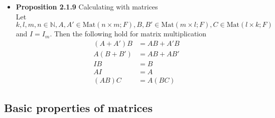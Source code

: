 \documentclass[11pt,a4paper]{article}
\begin{document}
\begin{itemize}
    \item \textbf{Proposition 2.1.9} Calculating with matrices \\
        Let $k, l, m, n \in \mathbb{N}, A, A' \in \mathrm{Mat}(n \times m;F),
        B, B' \in \mathrm{Mat}(m \times l;F), C \in \mathrm{Mat}(l \times k; F)$ and $I = I_m$.
        Then the following hold for matrix multiplication
        \begin{align*}{}
            (A + A')B & = AB + A'B \\
            A(B + B') & = AB + AB' \\
            IB        & = B \\
            AI        & = A \\
            (AB)C     & = A(BC)
        \end{align*}
\end{itemize}

\subsection{Basic properties of matrices}
\end{document}
